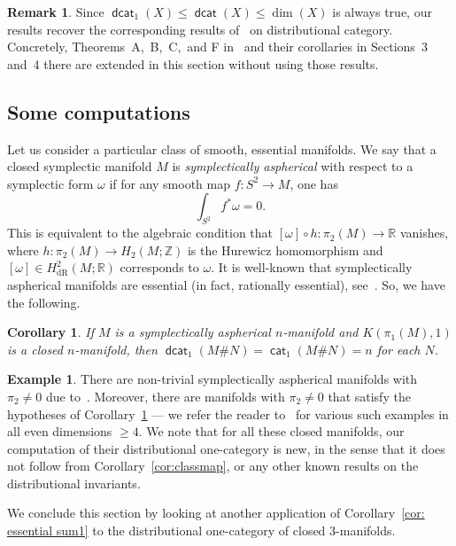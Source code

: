 \documentclass[amscd,amssymb,verbatim,11pt]{amsart}
\theoremstyle{plain}
\newtheorem{corollary}[thm]{Corollary}
\theoremstyle{definition}
\newtheorem{remark}[thm]{Remark}
\newtheorem{ex}[thm]{Example}
\DeclareMathOperator{\cat}{{\mathsf{cat}}}
\DeclareMathOperator{\dcat}{{\mathsf{dcat}}}
\def\Z{{\mathbb Z}}
\def\R{{\mathbb R}}
\begin{document}
\begin{remark}
    Since $\dcat_1(X)\le\dcat(X)\le\dim(X)$ is always true, our results recover the corresponding results of~\cite{Ja2} on distributional category. Concretely, Theorems~A,~B,~C,~and F in~\cite{Ja2} and their corollaries in Sections~3 and~4 there are extended in this section without using those results.
\end{remark}

\subsection{Some computations}\label{subsec:appl}
Let us consider a particular class of smooth, essential manifolds. We say that a closed symplectic manifold $M$ is \emph{symplectically aspherical} with respect to a symplectic form $\omega$ if for any smooth map $f\colon S^2\to M$, one has
\[
\int_{S^2}f^*\omega=0.
\]
This is equivalent to the algebraic condition that $[\omega]\circ h\colon \pi_2(M)\to\R$ vanishes, where $h\colon \pi_2(M)\to H_2(M;\Z)$ is the Hurewicz homomorphism and $[\omega]\in H_{\text{dR}}^2(M;\R)$ corresponds to $\omega$. It is well-known that symplectically aspherical manifolds are essential (in fact, rationally essential), see~\cite{RO}. So, we have the following.
\begin{corollary}\label{cor: symp asph}
    If $M$ is a symplectically aspherical $n$-manifold and $K(\pi_1(M),1)$ is a closed $n$-manifold, then $\dcat_1(M\# N)=\cat_1(M\# N)=n$ for each $N$.
\end{corollary}

\begin{ex}
There are non-trivial symplectically aspherical manifolds with $\pi_2\ne 0$ due to~\cite{Go}. Moreover, there are manifolds with $\pi_2\ne 0$ that satisfy the hypotheses of Corollary~\ref{cor: symp asph} --- we refer the reader to~\cite[Section 3.2]{Ja2} for various such examples in all even dimensions $\ge 4$. We note that for all these closed manifolds, our computation of their distributional one-category is new, in the sense that it does not follow from Corollary~\ref{cor:classmap}, or any other known results on the distributional invariants.
\end{ex}

We conclude this section by looking at another application of Corollary~\ref{cor: essential sum1} to the distributional one-category of closed $3$-manifolds.
\end{document}
